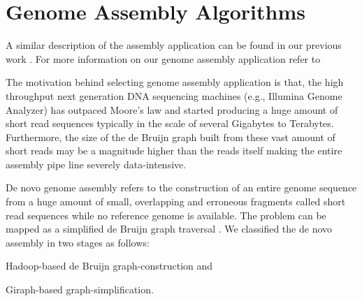 \documentclass[journal]{IEEEtran}
\begin{document}
\section{Genome Assembly Algorithms}
\label{app:GenomeAssemblyAlgorithms}
A similar description of the assembly application can be found in our previous work \cite{scaleupscaleout:das2015evaluating}. For more information on our genome assembly application refer to  

The motivation behind selecting genome assembly application is that, the high throughput next generation DNA sequencing machines (e.g., Illumina Genome Analyzer) has outpaced Moore's law and started producing a huge amount of short read sequences typically in the scale of several Gigabytes to Terabytes. Furthermore, the size of the de Bruijn graph built from these vast amount of short reads may be a magnitude higher than the reads itself making the entire assembly pipe line severely data-intensive.

De novo genome assembly refers to the construction of an entire genome sequence from a huge amount of small, overlapping and erroneous fragments called short read sequences while no reference genome is available. The problem can be mapped as a simplified de Bruijn graph traversal \cite{bio:debruijngraph}. We classified the de novo assembly in two stages as follows:
\begin{inparaenum}
\item Hadoop-based de Bruijn graph-construction and
\item Giraph-based graph-simplification.  
\end{inparaenum}
\end{document}

